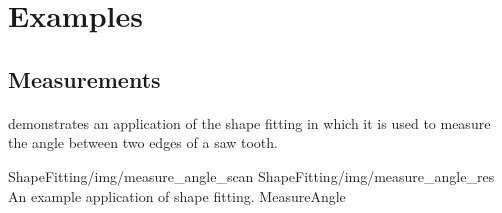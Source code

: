 \section{Examples}

\subsection{Measurements}

\paragraph*{}
 demonstrates an application of the shape fitting in which it is used to measure the angle between two edges of a saw tooth.

\twoFigures
{ShapeFitting/img/measure_angle_scan}
{ShapeFitting/img/measure_angle_res}
{An example application of shape fitting.}
{MeasureAngle}
{\basicWidth}
